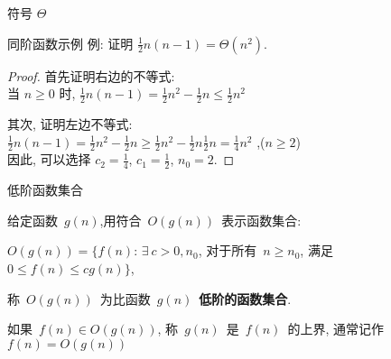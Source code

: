 \documentclass[fontset=fandol,UTF8,12pt,aspectratio=169,fleqn]{beamer}
\begin{document}
\begin{frame}{符号 $\Theta$}
\begin{figure}
  \centering
\end{figure}
\end{frame}
%

\begin{frame}{同阶函数示例}
例: 证明 $\frac{1}{2}n(n-1)=\Theta(n^2)$.   \\
\begin{proof}
首先证明右边的不等式:  \\ \pause
当 $n\geq 0$ 时, $\frac{1}{2}n(n-1)=\frac{1}{2}n^2-\frac{1}{2}n\leq
\frac{1}{2}n^2$   \\ \pause

其次, 证明左边不等式:  \\ \pause
$\frac{1}{2}n(n-1)=\frac{1}{2}n^2-\frac{1}{2}n\geq
\frac{1}{2}n^2-\frac{1}{2}n \frac{1}{2}n = \frac{1}{4}n^2 $ ,($n \geq
2$)  \\ \pause
因此, 可以选择 $c_2= \frac{1}{4}$, $c_1 = \frac{1}{2}$, $n_0=2$.  \pause
\end{proof}
\end{frame}

\begin{frame}{低阶函数集合}
\begin{definition}[低阶函数集合]
给定函数~$g(n)$,用符合~$O(g(n))$~表示函数集合: 
\begin{center}
  $ O(g(n)) = \{f(n)$: $\exists\ c > 0, n_0$, 对于所有~$n\geq n_0$,  满足~$0\leq f(n) \leq cg(n)\}$,
\end{center}
称~$O(g(n))$~为比函数~$g(n)$~\textbf{低阶的函数集合}.  

 如果~$f(n)\in O(g(n))$, 称~$g(n)$~是~$f(n)$~的上界, 
通常记作~$f(n)=O(g(n))$  
\end{definition}
\end{frame}
\end{document}
